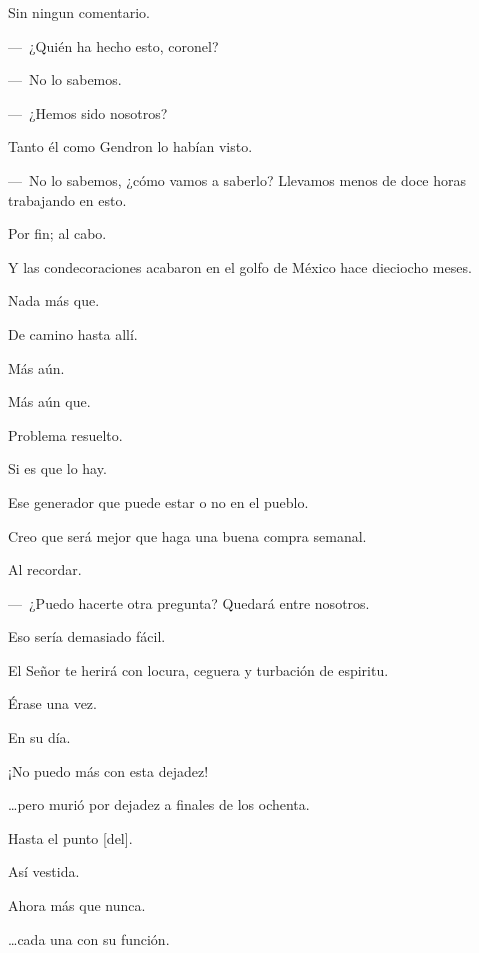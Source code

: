 \sk
Sin ningun comentario.

\sk
---~¿Quién ha hecho esto, coronel?

---~No lo sabemos.

---~¿Hemos sido nosotros?

\sk
Tanto él como Gendron lo habían visto.

\sk
---~No lo sabemos, ¿cómo vamos a saberlo? Llevamos menos de doce horas trabajando en esto.

\sk
Por fin; al cabo. 

\sk
Y las condecoraciones acabaron en el golfo de México hace dieciocho meses. 

\sk
Nada más que. 

\sk
De camino hasta allí. 

\sk
Más aún. 

\sk
Más aún que. 

\sk
Problema resuelto.

\sk
Si es que lo hay. 

\sk
Ese generador que puede estar o no en el pueblo.

\sk
Creo que será mejor que haga una buena compra semanal.

\sk
Al recordar. 

\sk
---~¿Puedo hacerte otra pregunta? Quedará entre nosotros. 

\sk
Eso sería demasiado fácil.

\sk
El Señor te herirá con locura, ceguera y turbación de espiritu. 

\sk
Érase una vez. 

\sk
En su día. 

\sk
¡No puedo más con esta dejadez!

\sk
\ldots{}pero murió por dejadez a finales de los ochenta.  

\sk
Hasta el punto [del]. 

\sk
Así vestida. 

\sk
Ahora más que nunca. 

\sk
\ldots{}cada una con su función.

